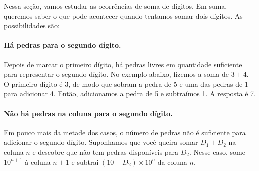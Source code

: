 \documentclass[12pt]{book}
\begin{document}
Nessa seção, vamos estudar as ocorrências
de soma de dígitos. Em suma, queremos saber
o que pode acontecer quando tentamos somar
dois dígitos. As possibilidades são:

\paragraph{Há pedras para o segundo dígito.}
Depois de marcar o primeiro dígito, há pedras
livres em quantidade suficiente para representar
o segundo dígito. No exemplo abaixo, fizemos a
soma de $3+4$. O primeiro
dígito é 3, de modo que sobram a pedra de 5
e uma das pedras de 1 para adicionar 4. Então,
adicionamos a pedra de 5 e subtraímos 1.
A resposta é 7.\\

\vspace{0.5cm}
\begin{minipage}{0.4\textwidth}
\end{minipage}%
%
\begin{minipage}{0.5\textwidth}
\end{minipage}

\vspace{0.5cm}
\paragraph{Não há pedras na coluna para o segundo dígito.}
Em pouco mais da metade dos casos, o número de pedras
não é suficiente para adicionar o segundo dígito.
Suponhamos que você queira somar $D_1+D_2$ na
coluna $n$ e descobre que não tem pedras disponíveis
para $D_2$. Nesse caso, some $10^{n+1}$ à coluna $n+1$
e subtrai $(10-D_2)\times 10^n$ da coluna $n$.
\end{document}

